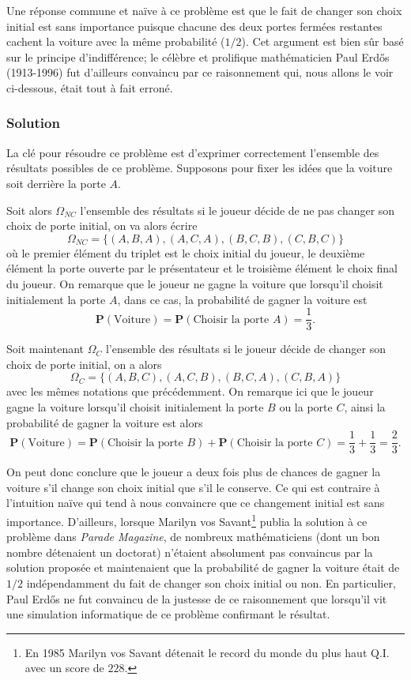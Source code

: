 \documentclass[11pt,a4paper]{article}
\begin{document}
Une réponse commune et naïve à ce problème est que le fait de changer son choix initial est sans importance puisque chacune des deux portes fermées restantes cachent la voiture avec la même probabilité ($1/2$). Cet argument est bien sûr basé sur le principe d'indifférence; le célèbre et prolifique mathématicien Paul Erd\H{o}s (1913-1996) fut d'ailleurs convaincu par ce raisonnement qui, nous allons le voir ci-dessous, était tout à fait erroné.

\subsubsection{Solution}

La clé pour résoudre ce problème est d'exprimer correctement l'ensemble des résultats possibles de ce problème. Supposons pour fixer les idées que la voiture soit derrière la porte $A$.

Soit alors $\Omega_{NC}$ l'ensemble des résultats si le joueur décide de ne pas changer son choix de porte initial, on va alors écrire
\[\Omega_{NC} = \{(A, B, A), (A, C, A), (B, C, B), (C, B, C)\}\]
où le premier élément du triplet est le choix initial du joueur, le deuxième élément la porte ouverte par le présentateur et le troisième élément le choix final du joueur. On remarque que le joueur ne gagne la voiture que lorsqu'il choisit initialement la porte $A$, dans ce cas, la probabilité de gagner la voiture est
\[\mathbf{P}(\mbox{Voiture}) = \mathbf{P}(\mbox{Choisir la porte }A) = \frac{1}{3}.\]

Soit maintenant $\Omega_C$ l'ensemble des résultats si le joueur décide de changer son choix de porte initial, on a alors
\[\Omega_C = \{(A, B, C), (A, C, B), (B, C, A), (C, B, A)\}\]
avec les mêmes notations que précédemment. On remarque ici que le joueur gagne la voiture lorsqu'il choisit initialement la porte $B$ ou la porte $C$, ainsi la probabilité de gagner la voiture est alors
\[\mathbf{P}(\mbox{Voiture}) = \mathbf{P}(\mbox{Choisir la porte }B) + \mathbf{P}(\mbox{Choisir la porte }C) = \frac{1}{3} + \frac{1}{3} = \frac{2}{3}.\]

On peut donc conclure que le joueur a deux fois plus de chances de gagner la voiture s'il change son choix initial que s'il le conserve. Ce qui est contraire à l'intuition naïve qui tend à nous convaincre que ce changement initial est sans importance. D'ailleurs, lorsque Marilyn vos Savant\footnote{En 1985 Marilyn vos Savant détenait le record du monde du plus haut Q.I. avec un score de $228$.} publia la solution à ce problème dans \textsl{Parade Magazine}, de nombreux mathématiciens (dont un bon nombre détenaient un doctorat) n'étaient absolument pas convaincus par la solution proposée et maintenaient que la probabilité de gagner la voiture était de $1/2$ indépendamment du fait de changer son choix initial ou non. En particulier, Paul Erd\H{o}s ne fut convaincu de la justesse de ce raisonnement que lorsqu'il vit une simulation informatique de ce problème confirmant le résultat.
\end{document}
